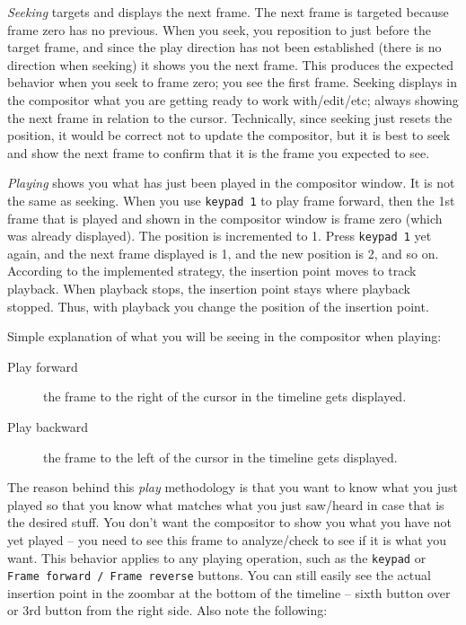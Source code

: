 \textit{Seeking} targets and displays the next frame.  The next frame is targeted because frame zero has no previous.  When you seek, you reposition to just before the target frame, and since the play direction has not been established (there is no direction when seeking) it shows you the next frame.  This produces the expected behavior when you seek to frame zero; you see the first frame.  Seeking displays in the compositor what you are getting ready to work with/edit/etc; always showing the next frame in relation to the cursor. Technically, since seeking just resets the position, it would be correct not to update the compositor, but it is best to seek and show the next frame to confirm that it is the frame you expected to see.

\textit{Playing} shows you what has just been played in the compositor window.  It is not the same as seeking. When you use \texttt{keypad 1} to play frame forward, then the 1st frame that is played and shown in the compositor window is frame zero (which was already displayed).  The position is incremented to 1.  Press \texttt{keypad 1} yet again, and the next frame displayed is 1, and the new position is 2, and so on.  According to the implemented strategy, the insertion point moves to track playback.  When playback stops, the insertion point stays where playback stopped.  Thus, with playback you change the position of the insertion point.

Simple explanation of what you will be seeing in the compositor when playing:

\begin{description}
    \item[Play forward] the frame to the right of the cursor in the timeline gets displayed.
    \item[Play backward] the frame to the left of the cursor in the timeline gets displayed.
\end{description}

The reason behind this \textit{play} methodology is that you want to know what you just played so that you know what matches what you just saw/heard in case that is the desired stuff.   You don't want the compositor to show you what you have not yet played -- you need to see this frame to analyze/check to see if it is what you want.  This behavior applies to any playing operation, such as the \texttt{keypad} or \texttt{Frame forward / Frame reverse} buttons.  You can still easily see the actual insertion point in the zoombar at the bottom of the timeline -- sixth button over or 3rd button from the right side.   Also note the following:

